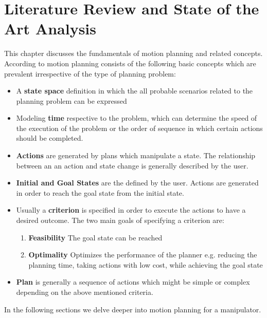  \section{Literature Review and State of the Art Analysis}
\localtableofcontents
This chapter discusses the fundamentals of motion planning and related concepts. According to \citet{Lav06}motion planning consists of the following basic concepts which are prevalent irrespective of the type of planning problem:
\begin{itemize}
\item A \textbf{state space} definition in which the all probable scenarios related to the planning problem can be expressed
\item Modeling \textbf{time} respective to the problem, which can determine the speed of the execution of the problem or the order of sequence in which certain actions should be completed.
\item \textbf{Actions} are generated by plans which manipulate a state. The relationship between an an action and state change is generally described by the user. 
\item \textbf{Initial and Goal States} are the defined by the user. Actions are generated in order to reach the goal state from the initial state.
\item Usually a \textbf{criterion} is specified in order to execute the actions to have a desired outcome. The two main goals of specifying a criterion are:
\begin{enumerate}
\item \textbf{Feasibility} The goal state can be reached 
\item \textbf{Optimality} Optimizes the performance of the planner e.g. reducing the planning time, taking actions with low cost, while achieving the goal state 
\end{enumerate}
\item \textbf{Plan} is generally a sequence of actions which might be simple or complex depending on the above mentioned criteria. 
\end{itemize}
In the following sections we delve deeper into motion planning for a manipulator.



